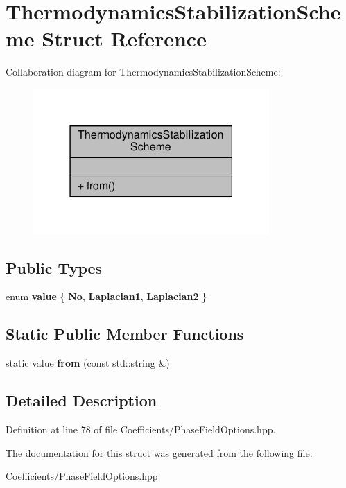 \hypertarget{structThermodynamicsStabilizationScheme}{}\section{Thermodynamics\+Stabilization\+Scheme Struct Reference}
\label{structThermodynamicsStabilizationScheme}


Collaboration diagram for Thermodynamics\+Stabilization\+Scheme\+:\nopagebreak
\begin{figure}[H]
\begin{center}
\leavevmode
\includegraphics[width=255pt]{structThermodynamicsStabilizationScheme__coll__graph}
\end{center}
\end{figure}
\subsection*{Public Types}
\begin{DoxyCompactItemize}
\item 
\mbox{\label{structThermodynamicsStabilizationScheme_a5d0b4bb44c187a9ed05509aed91158e8}} 
enum {\bfseries value} \{ {\bfseries No}, 
{\bfseries Laplacian1}, 
{\bfseries Laplacian2}
 \}
\end{DoxyCompactItemize}
\subsection*{Static Public Member Functions}
\begin{DoxyCompactItemize}
\item 
\mbox{\label{structThermodynamicsStabilizationScheme_a3c232eb960691d39052067d71e0469f0}} 
static value {\bfseries from} (const std\+::string \&)
\end{DoxyCompactItemize}


\subsection{Detailed Description}


Definition at line 78 of file Coefficients/\+Phase\+Field\+Options.\+hpp.



The documentation for this struct was generated from the following file\+:\begin{DoxyCompactItemize}
\item 
Coefficients/\+Phase\+Field\+Options.\+hpp\end{DoxyCompactItemize}
